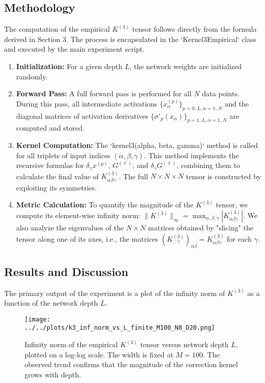 \documentclass{article}
\begin{document}
\subsection{Methodology}

The computation of the empirical $K^{(3)}$ tensor follows directly from the formula derived in Section 3. The process is encapsulated in the `Kernel3Empirical` class and executed by the main experiment script.

\begin{enumerate}
    \item \textbf{Initialization:} For a given depth $L$, the network weights are initialized randomly.
    \item \textbf{Forward Pass:} A full forward pass is performed for all $N$ data points. During this pass, all intermediate activations $\{x^{(p)}_\alpha\}_{p=0..L, \alpha=1..N}$ and the diagonal matrices of activation derivatives $\{\sigma'_p(x_\alpha)\}_{p=1..L, \alpha=1..N}$ are computed and stored.
    \item \textbf{Kernel Computation:} The `kernel3(alpha, beta, gamma)` method is called for all triplets of input indices $(\alpha, \beta, \gamma)$. This method implements the recursive formulas for $\delta_\gamma x^{(p)}$, $G^{(\ell)}$, and $\delta_\gamma G^{(\ell)}$, combining them to calculate the final value of $K^{(3)}_{\alpha\beta\gamma}$. The full $N \times N \times N$ tensor is constructed by exploiting its symmetries.
    \item \textbf{Metric Calculation:} To quantify the magnitude of the $K^{(3)}$ tensor, we compute its element-wise infinity norm: $\|K^{(3)}\|_\infty = \max_{\alpha,\beta,\gamma} |K^{(3)}_{\alpha\beta\gamma}|$. We also analyze the eigenvalues of the $N \times N$ matrices obtained by "slicing" the tensor along one of its axes, i.e., the matrices $(K^{(3)}_{::\gamma})_{\alpha\beta} = K^{(3)}_{\alpha\beta\gamma}$ for each $\gamma$.
\end{enumerate}


\subsection{Results and Discussion}

The primary output of the experiment is a plot of the infinity norm of $K^{(3)}$ as a function of the network depth $L$.

\begin{figure}[h]
    \centering
    \texttt{[image: ../../plots/k3\_inf\_norm\_vs\_L\_finite\_M100\_N8\_D20.png]}
    \caption{Infinity norm of the empirical $K^{(3)}$ tensor versus network depth $L$, plotted on a log-log scale. The width is fixed at $M=100$. The observed trend confirms that the magnitude of the correction kernel grows with depth.}
    \label{fig:k3_norm_vs_l}
\end{figure}
\end{document}
